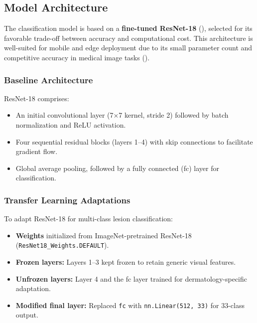 \documentclass[
  12pt,
  oneside]{article}
\providecommand{\tightlist}{%
  \setlength{\itemsep}{0pt}\setlength{\parskip}{0pt}}
\begin{document}
\subsection{Model Architecture}\label{model-architecture}

The classification model is based on a \textbf{fine-tuned ResNet-18}
(), selected for its favorable
trade-off between accuracy and computational cost. This architecture is
well-suited for mobile and edge deployment due to its small parameter
count and competitive accuracy in medical image tasks
().

\subsubsection{Baseline Architecture}\label{baseline-architecture}

ResNet-18 comprises:

\begin{itemize}
\tightlist
\item
  An initial convolutional layer (7×7 kernel, stride 2) followed by
  batch normalization and ReLU activation.
\item
  Four sequential residual blocks (layers 1--4) with skip connections to
  facilitate gradient flow.
\item
  Global average pooling, followed by a fully connected (fc) layer for
  classification.
\end{itemize}

\subsubsection{Transfer Learning
Adaptations}\label{transfer-learning-adaptations}

To adapt ResNet-18 for multi-class lesion classification:

\begin{itemize}
\tightlist
\item
  \textbf{Weights} initialized from ImageNet-pretrained ResNet-18
  (\texttt{ResNet18\_Weights.DEFAULT}).
\item
  \textbf{Frozen layers:} Layers 1--3 kept frozen to retain generic
  visual features.
\item
  \textbf{Unfrozen layers:} Layer 4 and the fc layer trained for
  dermatology-specific adaptation.
\item
  \textbf{Modified final layer:} Replaced \texttt{fc} with
  \texttt{nn.Linear(512,\ 33)} for 33-class output.
\end{itemize}
\end{document}
